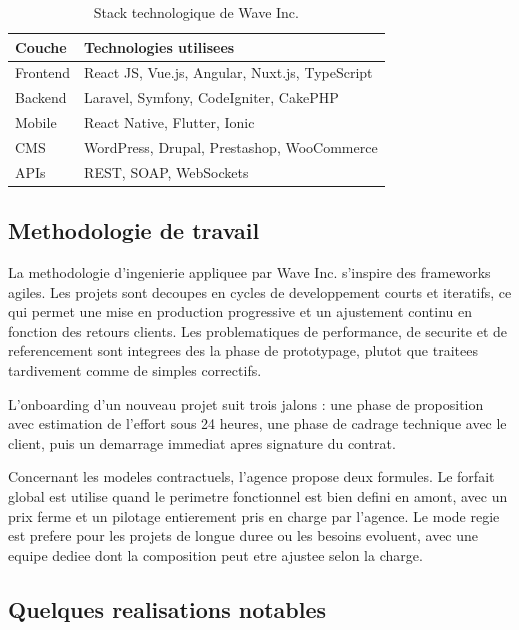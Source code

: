 \documentclass[12pt, a4paper]{report}
\begin{document}
\vspace{0.4cm}
\begin{table}[H]
\centering
\caption{Stack technologique de Wave Inc.}
\label{tab:stack_wave}
\begin{tabularx}{\textwidth}{@{}lX@{}}
\toprule
\textbf{Couche} & \textbf{Technologies utilisees} \\
\midrule
Frontend   & React JS, Vue.js, Angular, Nuxt.js, TypeScript \\
Backend    & Laravel, Symfony, CodeIgniter, CakePHP \\
Mobile     & React Native, Flutter, Ionic \\
CMS        & WordPress, Drupal, Prestashop, WooCommerce \\
APIs       & REST, SOAP, WebSockets \\
\bottomrule
\end{tabularx}
\end{table}

\subsection{Methodologie de travail}

La methodologie d'ingenierie appliquee par Wave Inc. s'inspire des frameworks
agiles. Les projets sont decoupes en cycles de developpement courts et iteratifs,
ce qui permet une mise en production progressive et un ajustement continu en
fonction des retours clients. Les problematiques de performance, de securite et
de referencement sont integrees des la phase de prototypage, plutot que traitees
tardivement comme de simples correctifs.

L'onboarding d'un nouveau projet suit trois jalons : une phase de proposition
avec estimation de l'effort sous 24 heures, une phase de cadrage technique avec
le client, puis un demarrage immediat apres signature du contrat.

Concernant les modeles contractuels, l'agence propose deux formules. Le forfait
global est utilise quand le perimetre fonctionnel est bien defini en amont,
avec un prix ferme et un pilotage entierement pris en charge par l'agence. Le
mode regie est prefere pour les projets de longue duree ou les besoins evoluent,
avec une equipe dediee dont la composition peut etre ajustee selon la charge.

\subsection{Quelques realisations notables}
\end{document}
